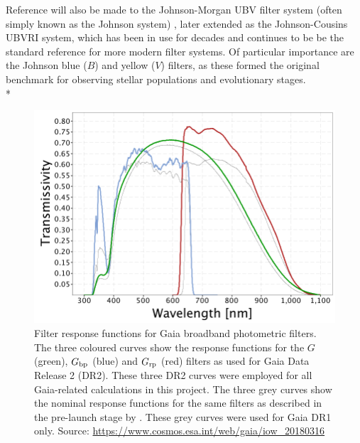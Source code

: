 \documentclass[12pt, a4paper]{report}
\begin{document}
Reference will also be made to the Johnson-Morgan UBV filter system (often simply known as the Johnson system) \citep{1953ApJ...117..313J}, later extended as the Johnson-Cousins UBVRI \citep{1990PASP..102.1181B} system, which has been in use for decades and continues to be be the standard reference for more modern filter systems. Of particular importance are the Johnson blue ($B$) and yellow ($V$) filters, as these formed the original benchmark for observing stellar populations and evolutionary stages. \\*

\begin{figure}[h!]
\begin{center}
\includegraphics[width=1.0\textwidth]{GaiaDR2Passbands.png}
\caption{Filter response functions for Gaia broadband photometric filters. The three coloured curves show the response functions for the $G$ (green), $G_{\textnormal{bp}}$ (blue) and $G_{\textnormal{rp}}$ (red) filters as used for Gaia Data Release 2 (DR2). These three DR2 curves were employed for all Gaia-related calculations in this project. The three grey curves show the nominal response functions for the same filters as described in the pre-launch stage by \cite{2010A&A...523A..48J}. These grey curves were used for Gaia DR1 only. Source: \protect\url{https://www.cosmos.esa.int/web/gaia/iow_20180316}}
\label{Gaia_response_funcs}
\end{center}
\end{figure}
\end{document}
